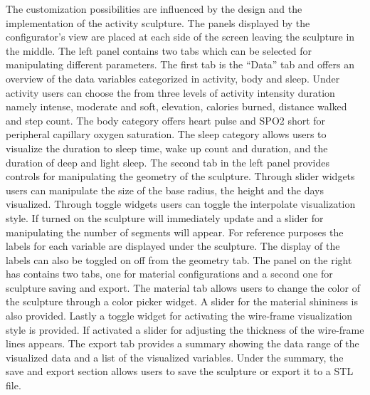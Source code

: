 \documentclass[../medieninformatik-arbeit.tex]{subfiles}
\begin{document}
The customization possibilities are influenced by the design and the implementation of the activity sculpture. The panels displayed by the configurator's view are placed at each side of the screen leaving the sculpture in the middle. The left panel contains two tabs which can be selected for manipulating different parameters. The first tab is the ``Data'' tab and offers an overview of the data variables categorized in activity, body and sleep. Under activity users can choose the from three levels of activity intensity duration namely intense, moderate and soft, elevation, calories burned, distance walked and step count. The body category offers heart pulse and SPO2 short for peripheral capillary oxygen saturation. The sleep category allows users to visualize the duration to sleep time, wake up count and duration, and the duration of deep and light sleep. The second tab in the left panel provides controls for manipulating the geometry of the sculpture. Through slider widgets users can manipulate the size of the base radius, the height and the days visualized. Through toggle widgets users can toggle the interpolate visualization style. If turned on the sculpture will immediately update and a slider for manipulating the number of segments will appear. For reference purposes the labels for each variable are displayed under the sculpture. The display of the labels can also be toggled on off from the geometry tab. The panel on the right has contains two tabs, one for material configurations and a second one for sculpture saving and export. The material tab allows users to change the color of the sculpture through a color picker widget. A slider for the material shininess is also provided. Lastly a toggle widget for activating the wire-frame visualization style is provided. If activated a slider for adjusting the thickness of the wire-frame lines appears. The export tab provides a summary showing the data range of the visualized data and a list of the visualized variables. Under the summary, the save and export section allows users to save the sculpture or export it to a STL file. 
\end{document}

